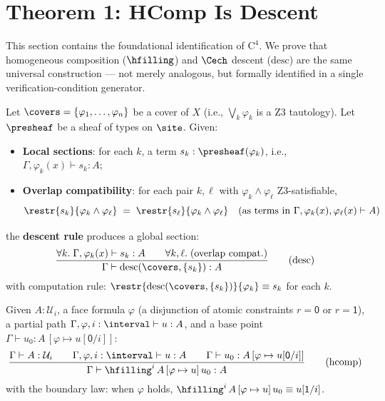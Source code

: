 \section{Theorem 1: HComp Is Descent}
\label{sec:hcomp-is-descent}

This section contains the foundational identification of $\mathrm{C}^4$.
We prove that homogeneous composition ($\hfilling$) and $\Cech$ descent
($\mathrm{desc}$) are the same universal construction --- not merely analogous,
but formally identified in a single verification-condition generator.

\begin{definition}
\label{def:descent-rule}
Let $\covers = \{\varphi_1, \ldots, \varphi_n\}$ be a cover of $X$
(i.e., $\bigvee_k \varphi_k$ is a Z3 tautology).  Let $\presheaf$ be a
sheaf of types on $\site$.  Given:
\begin{itemize}
\item \textbf{Local sections}: for each $k$, a term
  $s_k : \presheaf(\varphi_k)$, i.e., $\Gamma, \varphi_k(x) \vdash s_k : A$;
\item \textbf{Overlap compatibility}: for each pair $k, \ell$ with
  $\varphi_k \wedge \varphi_\ell$ Z3-satisfiable,
  \[
    \restr{s_k}{\varphi_k \wedge \varphi_\ell}
    \;=\;
    \restr{s_\ell}{\varphi_k \wedge \varphi_\ell}
    \quad\text{(as terms in $\Gamma, \varphi_k(x), \varphi_\ell(x) \vdash A$)}
  \]
\end{itemize}
the \textbf{descent rule} produces a global section:
\[
\frac{
  \forall k.\;\Gamma, \varphi_k(x) \vdash s_k : A \qquad
  \forall k, \ell.\;\text{(overlap compat.)}
}{
  \Gamma \vdash \mathrm{desc}(\covers, \{s_k\}) : A
}
\tag{desc}
\]
with computation rule: $\restr{\mathrm{desc}(\covers, \{s_k\})}{\varphi_k}
\equiv s_k$ for each $k$.
\end{definition}

\begin{definition}
\label{def:hcomp}
Given $A : \mathcal{U}_i$, a face formula $\varphi$ (a disjunction of
atomic constraints $r = \mathsf{0}$ or $r = \mathsf{1}$), a partial path
$\Gamma, \varphi, i : \interval \vdash u : A$, and a base point
$\Gamma \vdash u_0 : A\,[\varphi \mapsto u[\mathsf{0}/i]]$:
\[
\frac{\Gamma \vdash A : \mathcal{U}_i \qquad
      \Gamma, \varphi, i : \interval \vdash u : A \qquad
      \Gamma \vdash u_0 : A\,[\varphi \mapsto u[\mathsf{0}/i]]}
     {\Gamma \vdash \hfilling^i\, A\, [\varphi \mapsto u]\, u_0 : A}
\tag{hcomp}
\]
with the boundary law: when $\varphi$ holds,
$\hfilling^i\, A\, [\varphi \mapsto u]\, u_0 \equiv u[\mathsf{1}/i]$.
\end{definition}

